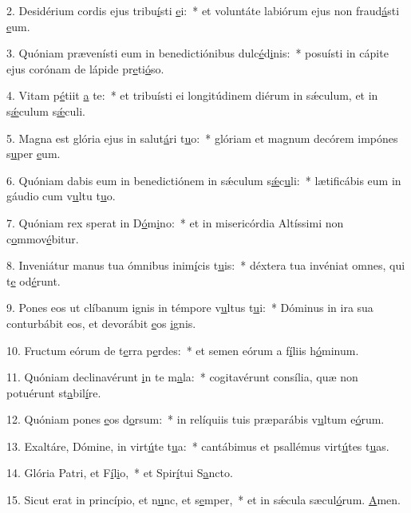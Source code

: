 2. Desidérium cordis ejus tribu\uline{í}sti \uline{e}i:~* et voluntáte labiórum ejus non fraud\uline{á}sti \uline{e}um.\par 
3. Quóniam prævenísti eum in benedictiónibus dulc\uline{é}d\uline{i}nis:~* posuísti in cápite ejus corónam de lápide pr\uline{e}ti\uline{ó}so.\par 
4. Vitam p\uline{é}tiit \uline{a} te:~* et tribuísti ei longitúdinem diérum in sǽculum, et in s\uline{ǽ}culum s\uline{ǽ}culi.\par 
5. Magna est glória ejus in salut\uline{á}ri t\uline{u}o:~* glóriam et magnum decórem impónes s\uline{u}per \uline{e}um.\par 
6. Quóniam dabis eum in benedictiónem in sǽculum s\uline{ǽ}c\uline{u}li:~* lætificábis eum in gáudio cum v\uline{u}ltu t\uline{u}o.\par 
7. Quóniam rex sperat in D\uline{ó}m\uline{i}no:~* et in misericórdia Altíssimi non c\uline{o}mmov\uline{é}bitur.\par 
8. Inveniátur manus tua ómnibus inim\uline{í}cis t\uline{u}is:~* déxtera tua invéniat omnes, qui t\uline{e} od\uline{é}runt.\par 
9. Pones eos ut clíbanum ignis in témpore v\uline{u}ltus t\uline{u}i:~* Dóminus in ira sua conturbábit eos, et devorábit \uline{e}os \uline{i}gnis.\par 
10. Fructum eórum de t\uline{e}rra p\uline{e}rdes:~* et semen eórum a f\uline{í}liis h\uline{ó}minum.\par 
11. Quóniam declinavérunt \uline{i}n te m\uline{a}la:~* cogitavérunt consília, quæ non potuérunt st\uline{a}bil\uline{í}re.\par 
12. Quóniam pones \uline{e}os d\uline{o}rsum:~* in relíquiis tuis præparábis v\uline{u}ltum e\uline{ó}rum.\par 
13. Exaltáre, Dómine, in virt\uline{ú}te t\uline{u}a:~* cantábimus et psallémus virt\uline{ú}tes t\uline{u}as.\par 
14. Glória Patri, et F\uline{í}l\uline{i}o,~* et Spir\uline{í}tui S\uline{a}ncto.\par 
15. Sicut erat in princípio, et n\uline{u}nc, et s\uline{e}mper,~* et in sǽcula sæcul\uline{ó}rum. \uline{A}men.\par 

